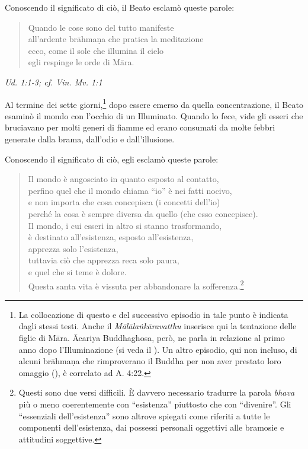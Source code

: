Conoscendo il significato di ciò, il Beato esclamò queste parole:


\begin{quotation}
Quando le cose sono del tutto manifeste \\
all’ardente brāhmaṇa che pratica la meditazione \\
ecco, come il sole che illumina il cielo \\
egli respinge le orde di Māra.
\end{quotation}

\emph{Ud. 1:1-3; cf. Vin. Mv. 1:1}


Al termine dei sette giorni,\footnote{La collocazione di questo e del successivo episodio in tale punto è indicata dagli stessi testi. Anche il \emph{Mālālaṅkāravatthu} inserisce qui la tentazione delle figlie di Māra. Ācariya Buddhaghosa, però, ne parla in relazione al primo anno dopo l’Illuminazione (si veda il \hyperlink{cap-04-La-diffusione-del-Dhamma#pag70}{}). Un altro episodio, qui non incluso, di alcuni brāhmaṇa che rimproverano il Buddha per non aver prestato loro omaggio (\hyperlink{cap-09-La-fine-del-primo-ventennio#pag137}{}), è correlato ad A. 4:22.} dopo essere emerso da
quella concentrazione, il Beato esaminò il mondo con l’occhio di un
Illuminato. Quando lo fece, vide gli esseri che bruciavano per molti
generi di fiamme ed erano consumati da molte febbri generate dalla
brama, dall’odio e dall’illusione.


Conoscendo il significato di ciò, egli esclamò queste parole:


\begin{quotation}
Il mondo è angosciato in quanto esposto al contatto, \\
perfino quel che il mondo chiama “io” è nei fatti nocivo, \\
e non importa che cosa concepisca (i concetti dell’io) \\
perché la cosa è sempre diversa da quello (che esso concepisce). \\
Il mondo, i cui esseri in altro si stanno trasformando, \\
è destinato all’esistenza, esposto all’esistenza, \\
apprezza solo l’esistenza, \\
tuttavia ciò che apprezza reca solo paura, \\
e quel che si teme è dolore. \\
Questa santa vita è vissuta per abbandonare la
sofferenza.\footnote{Questi sono due versi difficili. È davvero necessario tradurre la parola \emph{bhava} più o meno coerentemente con “esistenza” piuttosto che con “divenire”. Gli “essenziali dell’esistenza” sono altrove spiegati come riferiti a tutte le componenti dell’esistenza, dai possessi personali oggettivi alle bramosie e attitudini soggettive.}
\end{quotation}

